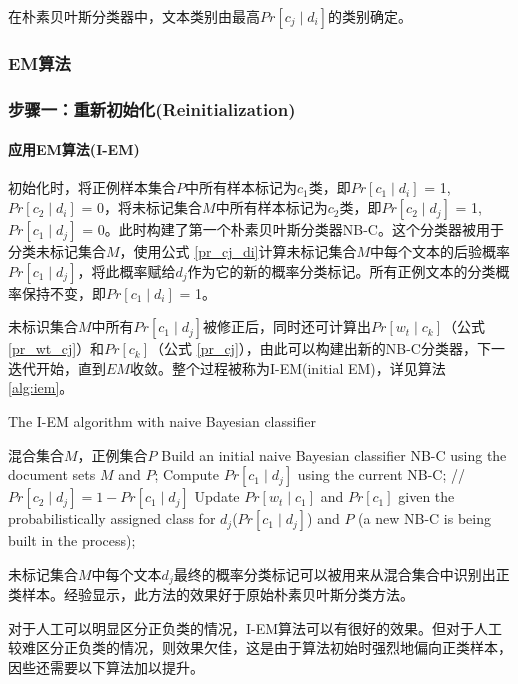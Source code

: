 在朴素贝叶斯分类器中，文本类别由最高$Pr[c_j \mid d_i]$的类别确定。

\subsubsection{EM算法}

\subsubsection{步骤一：重新初始化(Reinitialization)}

\paragraph{应用EM算法(I-EM)}
初始化时，将正例样本集合$P$中所有样本标记为$c_1$类，即$Pr[c_1 \mid d_i]$ = 1, $Pr[c_2 \mid d_i]$ = 0，将未标记集合$M$中所有样本标记为$c_2$类，即$Pr[c_2 \mid d_j]$ = 1, $Pr[c_1 \mid d_j]$ = 0。此时构建了第一个朴素贝叶斯分类器NB-C。这个分类器被用于分类未标记集合$M$，使用公式 \ref{pr_cj_di}计算未标记集合$M$中每个文本的后验概率$Pr[c_1 \mid
d_j]$，将此概率赋给$d_j$作为它的新的概率分类标记。所有正例文本的分类概率保持不变，即$Pr[c_1 \mid d_i]$ = 1。

未标识集合$M$中所有$Pr[c_1 \mid d_j]$被修正后，同时还可计算出$Pr[w_t \mid c_k]$（公式 \ref{pr_wt_cj}）和$Pr[c_k]$（公式 \ref{pr_cj}），由此可以构建出新的NB-C分类器，下一迭代开始，直到$EM$收敛。整个过程被称为I-EM(initial EM)，详见算法 \ref{alg:iem}。


\begin{algorithm}[htb]
\caption{The I-EM algorithm with naive Bayesian classifier}
\label{alg:iem}
\begin{algorithmic}[1]
\REQUIRE 混合集合$M$，正例集合$P$
\STATE Build an initial naive Bayesian classifier NB-C using the document sets $M$ and $P$;
\STATE Compute $Pr[c_1 \mid d_j]$ using the current NB-C;
\STATE // $Pr[c_2 \mid d_j] = 1 - Pr[c_1 \mid d_j]$
\STATE Update $Pr[w_t \mid c_1]$ and $Pr[c_1]$ given the probabilistically assigned class for $d_j$($Pr[c_1 \mid d_j]$) and $P$ (a new NB-C is being built in the process);
\ENDFOR
\ENDWHILE
\RETURN 
\end{algorithmic}
\end{algorithm}
	未标记集合$M$中每个文本$d_j$最终的概率分类标记可以被用来从混合集合中识别出正类样本。经验显示，此方法的效果好于原始朴素贝叶斯分类方法。

对于人工可以明显区分正负类的情况，I-EM算法可以有很好的效果。但对于人工较难区分正负类的情况，则效果欠佳，这是由于算法初始时强烈地偏向正类样本，因些还需要以下算法加以提升。

